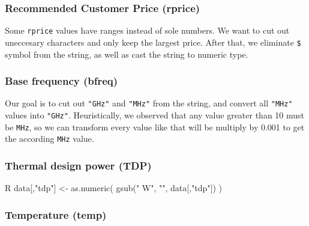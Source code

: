 \subsubsection*{Recommended Customer Price (rprice)}


Some \verb|rprice| values have ranges instead of sole numbers. We want to cut out uneccesary characters and only keep the largest price.
After that, we eliminate \verb|$| symbol from the string, as well as cast the string to numeric type.

\subsubsection*{Base frequency (bfreq)}


Our goal is to cut out \verb|"GHz"| and \verb|"MHz"| from the string, and convert all \verb|"MHz"| values into \verb|"GHz"|. Heuristically,
we observed that any value greater than 10 must be \verb|MHz|, so we can transform every value like that will be multiply by 0.001 to get 
the according \verb|MHz| value.

\subsubsection*{Thermal design power (TDP)}

\begin{code}{R}
data[,"tdp"] <- as.numeric(
    gsub(" W", "", data[,"tdp"])
)    
\end{code}

\subsubsection*{Temperature (temp)}

